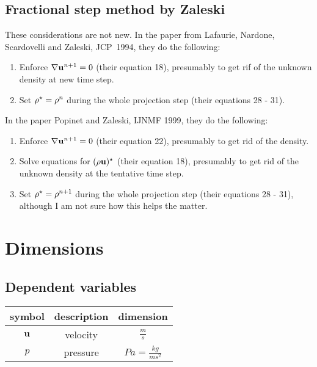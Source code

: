 \documentclass{report}
\begin{document}
\subsection{Fractional step method by Zaleski}

These considerations are not new. In the paper from Lafaurie, Nardone,
Scardovelli and Zaleski, JCP~1994, they do the following:

\begin{enumerate}
  \item Enforce $\nabla {\bf u}^{n+1} = 0$ (their equation 18), 
        presumably to get rif of the unknown density at new time step.
  \item Set $\rho^\star = \rho^n$ during the whole projection step (their
        equations 28 - 31).
\end{enumerate}

In the paper Popinet and Zaleski, IJNMF 1999, they do the following:

\begin{enumerate}
  \item Enforce $\nabla {\bf u}^{n+1} = 0$ (their equation 22), 
        presumably to get rid of the density. 
  \item Solve equations for $(\rho {\bf u})^\star$ (their equation 18), 
        presumably to get rid of the unknown density at the tentative
        time step. 
  \item Set $\rho^\star = \rho^{n+1}$ during the whole projection step (their
        equations 28 - 31), although I am not sure how this helps the
        matter.
\end{enumerate}

\section{Dimensions}

\subsection{Dependent variables}

\begin{center}
  \begin{tabular*}{0.75\textwidth}{@{\extracolsep{\fill}}|ccc|} 
    \hline
         symbol   & description       & dimension                \\
    \hline
    \hline
         ${\bf u}$   & velocity          & $\frac{m}{s}$            \\
    \hline
         $p$      & pressure          & $Pa = \frac{kg}{ms^2} $  \\
    \hline
  \end{tabular*}
\end{center}
\end{document}
